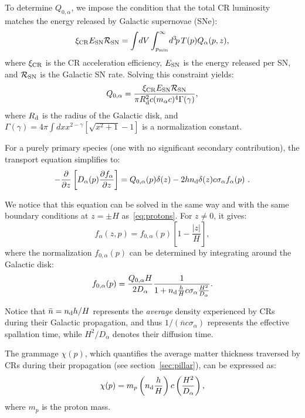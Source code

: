 To determine \(Q_{0,\alpha}\), we impose the condition that the total CR luminosity matches the energy released by Galactic supernovae (SNe):  
\begin{equation}
\xi_{\rm CR} E_{\rm SN} \mathcal{R}_{\rm SN} = \int \! dV \int_{p_{\rm min}}^\infty \! d^3 \! p \, T(p) Q_\alpha(p, z),
\end{equation}
where \(\xi_{\rm CR}\) is the CR acceleration efficiency, \(E_{\rm SN}\) is the energy released per SN, and \(\mathcal{R}_{\rm SN}\) is the Galactic SN rate. Solving this constraint yields:  
\begin{equation}
Q_{0,\alpha} = \frac{\xi_{\rm CR} E_{\rm SN} \mathcal{R}_{\rm SN}}{\pi R_{\rm d}^2 c (m_\alpha c)^4 \Gamma(\gamma)},
\end{equation}
where \(R_{\rm d}\) is the radius of the Galactic disk, and \(\Gamma(\gamma) = 4\pi \int dx x^{2-\gamma} \left[ \sqrt{x^2 + 1} - 1 \right] \) is a normalization constant.

For a purely primary species (one with no significant secondary contribution), the transport equation simplifies to:  
\begin{equation}
-\frac{\partial}{\partial z} \left[ D_\alpha(p) \frac{\partial f_\alpha}{\partial z} \right] = Q_{0,\alpha}(p)\delta(z) - 2 h n_{\rm d} \delta (z) c \sigma_\alpha f_\alpha(p)~.
\end{equation}

We notice that this equation can be solved in the same way and with the same boundary conditions at $z = \pm H$ as~\ref{eq:protons}. 
%
For $z \neq 0$, it gives:
\begin{equation}
f_\alpha(z, p) = f_{0,\alpha}(p) \left[ 1 - \frac{|z|}{H} \right],
\end{equation}
where the normalization \(f_{0,\alpha}(p)\) can be determined by integrating around the Galactic disk:  
\begin{equation}
f_{0,\alpha}(p) = \frac{Q_{0,\alpha} H}{2D_\alpha} \frac{1}{1 + n_{\rm d} \frac{h}{H} c \sigma_\alpha \frac{H^2}{D_\alpha}}.
\end{equation}

Notice that $\bar n = n_{\rm d} h/H$ represents the \emph{average} density experienced by CRs during their Galactic propagation, and thus $1/(\bar n c \sigma_\alpha)$ represents the effective spallation time, while $H^2/D_\alpha$ denotes their diffusion time.

The grammage \(\chi(p)\), which quantifies the average matter thickness traversed by CRs during their propagation (see section~\ref{sec:pillar}), can be expressed as:  
\begin{equation}\label{eq:grammage}
\chi(p) = m_p \left( n_{\rm d} \frac{h}{H} \right) c \left( \frac{H^2}{D_\alpha} \right),
\end{equation}
where \(m_p\) is the proton mass. 

